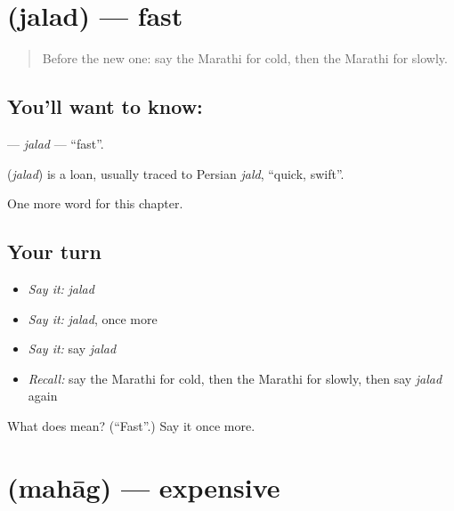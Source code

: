 \section[\texorpdfstring{\mr{जलद} (jalad)}{जलद (jalad)}]{ (jalad) — fast}

\label{lesson:MR-C104-jalad}



\begin{quote}
Before the new one: say the Marathi for cold, then the Marathi for slowly.
\end{quote}

\subsection*{You'll want to know: }
\textbf{} — \emph{jalad} — \textquotedblleft{}fast\textquotedblright{}.

\begin{cousinweb}
\textbf{} (\emph{jalad}) is a loan, usually traced to Persian \emph{jald}, \textquotedblleft{}quick, swift\textquotedblright{}.
\end{cousinweb}

\begin{grammarlens}[title={What you've built}]
One more word for this chapter.
\end{grammarlens}

\subsection*{Your turn}
\begin{itemize}
\raggedright
  \item \emph{Say it:} \emph{jalad}
  \item \emph{Say it:} \emph{jalad}, once more
  \item \emph{Say it:} say \emph{jalad}
  \item \emph{Recall:} say the Marathi for cold, then the Marathi for slowly, then say \emph{jalad} again
\end{itemize}

\begin{tcolorbox}[breakable,colback=teal!4,colframe=teal!35!black,title={Before you move on}]
What does  mean? (\textquotedblleft{}Fast\textquotedblright{}.) Say it once more.
\end{tcolorbox}
\section[\texorpdfstring{\mr{महाग} (mahāg)}{महाग (mahāg)}]{ (mahāg) — expensive}

